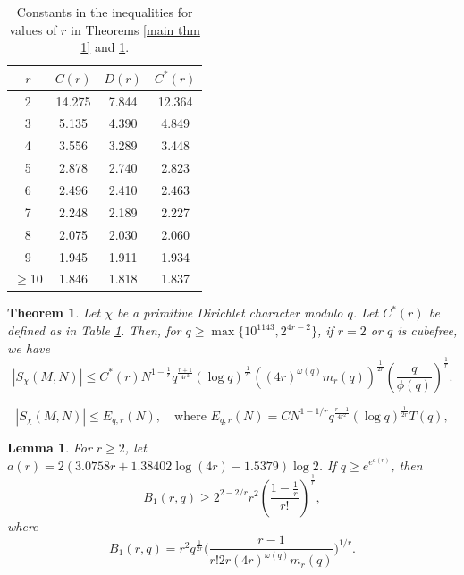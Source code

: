 \documentclass[10pt,a4paper]{amsart}
\newtheorem{theorem}{Theorem}
\newtheorem{lemma}{Lemma}
\begin{document}
\begin{table}[h!]
\begin{center}
  \begin{tabular}{ | c | c | c|c|}
    \hline
    $r$ & $C(r)$ & $D(r)$ & $C^*(r)$ \\ \hline
    2 & 14.275 & 7.844 &  12.364\\ \hline
    3 & 5.135 & 4.390 & 4.849\\ \hline
    4 & 3.556 & 3.289 & 3.448\\ \hline
    5 & 2.878 & 2.740 & 2.823\\ \hline
    6 & 2.496 & 2.410 & 2.463\\ \hline
    7 & 2.248 & 2.189 & 2.227\\ \hline
    8 & 2.075 & 2.030 & 2.060\\ \hline
    9 & 1.945 & 1.911 & 1.934\\ \hline
    $\ge$10 & 1.846 & 1.818 & 1.837\\ \hline
  \end{tabular}
  \caption{Constants in the inequalities for values of $r$ in Theorems \ref{main thm 1} and \ref{main theorem 2}.}\label{Table 1}
\end{center}
\end{table}

\begin{theorem}\label{main theorem 2}
    Let $\chi$ be a primitive Dirichlet character modulo $q$. Let $C^{*}(r)$ be defined as in Table \ref{Table 1}. Then, for $q \ge \max\{10^{1143}, 2^{4r-2}\}$, if $r=2$ or $q$ is cubefree, we have
    $$|S_{\chi}(M,N)| \le C^{*}(r)N^{1-\frac{1}{r}} q^{\frac{r+1}{4r^2}}(\log{q})^{\frac{1}{2r}}\left((4r)^{\omega(q)}m_r(q)\right)^{\frac{1}{2r}}\left(\frac{q}{\phi(q)}\right)^{\frac{1}{r}}.$$
\end{theorem}

\begin{equation} \label{eq desired bound}
| S_\chi(M,N) | \le E_{q,r}(N), \quad\text{where }
E_{q,r}(N) = C N^{1-1/r} q^{\frac{r+1}{4r^2}} (\log q)^{\frac{1}{2r}} T(q),
\end{equation}

\begin{lemma} \label{B will be at least 10 if it kills us lemma}
For $r\ge 2$, let $a(r) = 2\left(3.0758r+1.38402\log(4r)-1.5379\right)\log{2}$. If $q \ge e^{e^{a(r)}}$, then $$B_1(r,q)\ge 2^{2-2/r}r^2\left(\frac{1-\frac{1}{r}}{r!}\right)^{\frac{1}{r}},$$
where 
\begin{equation}\label{def B_1}
B_1(r,q) = r^2q^{\frac{1}{2r}}\biggl( \frac{r-1}{r!2r(4r)^{\omega(q)}m_r(q)} \biggr)^{1/r}.
\end{equation}
\end{lemma}
\end{document}
